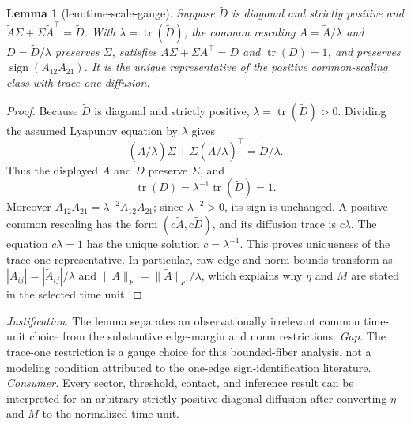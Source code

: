 \documentclass{article}
\newtheorem{lemma}{Lemma}
\begin{document}
\begin{lemma}[lem:time-scale-gauge]\label{lem:time-scale-gauge}
Suppose \(\widetilde D\) is diagonal and strictly positive and \(\widetilde A\Sigma+\Sigma\widetilde A^{\top}=\widetilde D\). With \(\lambda=\operatorname{tr}(\widetilde D)\), the common rescaling \(A=\widetilde A/\lambda\) and \(D=\widetilde D/\lambda\) preserves \(\Sigma\), satisfies \(A\Sigma+\Sigma A^{\top}=D\) and \(\operatorname{tr}(D)=1\), and preserves \(\operatorname{sign}(A_{12}A_{21})\). It is the unique representative of the positive common-scaling class with trace-one diffusion.
\end{lemma}
\begin{proof}
Because \(\widetilde D\) is diagonal and strictly positive, \(\lambda=\operatorname{tr}(\widetilde D)>0\).  Dividing the assumed Lyapunov equation by \(\lambda\) gives
\[
 (\widetilde A/\lambda)\Sigma+\Sigma(\widetilde A/\lambda)^{\top}
 =\widetilde D/\lambda.
\]
Thus the displayed \(A\) and \(D\) preserve \(\Sigma\), and
\[
 \operatorname{tr}(D)=\lambda^{-1}\operatorname{tr}(\widetilde D)=1.
\]
Moreover \(A_{12}A_{21}=\lambda^{-2}\widetilde A_{12}\widetilde A_{21}\); since \(\lambda^{-2}>0\), its sign is unchanged.  A positive common rescaling has the form \((c\widetilde A,c\widetilde D)\), and its diffusion trace is \(c\lambda\).  The equation \(c\lambda=1\) has the unique solution \(c=\lambda^{-1}\).  This proves uniqueness of the trace-one representative.  In particular, raw edge and norm bounds transform as \(|A_{ij}|=|\widetilde A_{ij}|/\lambda\) and \(\lVert A\rVert_F=\lVert\widetilde A\rVert_F/\lambda\), which explains why \(\eta\) and \(M\) are stated in the selected time unit.
\end{proof}
\par\smallskip\noindent \textit{Justification.} The lemma separates an observationally irrelevant common time-unit choice from the substantive edge-margin and norm restrictions. \textit{Gap.} The trace-one restriction is a gauge choice for this bounded-fiber analysis, not a modeling condition attributed to the one-edge sign-identification literature. \textit{Consumer.} Every sector, threshold, contact, and inference result can be interpreted for an arbitrary strictly positive diagonal diffusion after converting \(\eta\) and \(M\) to the normalized time unit.
\end{document}
